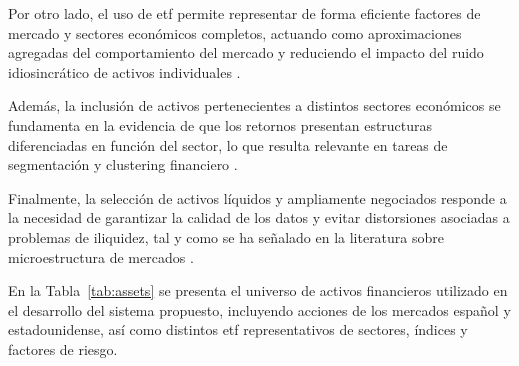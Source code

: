 \documentclass[
]{article}
\begin{document}
Por otro lado, el uso de \gls{etf} permite representar de forma eficiente factores de mercado y sectores económicos completos, actuando como aproximaciones agregadas del comportamiento del mercado y reduciendo el impacto del ruido idiosincrático de activos individuales \parencite{madhavan2012exchange}.

Además, la inclusión de activos pertenecientes a distintos sectores económicos se fundamenta en la evidencia de que los retornos presentan estructuras diferenciadas en función del sector, lo que resulta relevante en tareas de segmentación y \gls{clustering} financiero \parencite{fama1997industry}.

Finalmente, la selección de activos líquidos y ampliamente negociados responde a la necesidad de garantizar la calidad de los datos y evitar distorsiones asociadas a problemas de iliquidez, tal y como se ha señalado en la literatura sobre microestructura de mercados \parencite{amihud2002illiquidity}.

En la Tabla~\ref{tab:assets} se presenta el universo de activos financieros utilizado en el desarrollo del sistema propuesto, incluyendo acciones de los mercados español y estadounidense, así como distintos \gls{etf} representativos de sectores, índices y factores de riesgo.
\end{document}
